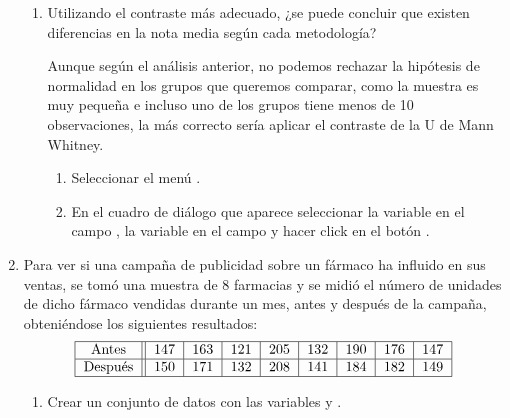 \begin{enumerate}[leftmargin=*]
\begin{enumerate}
\item Utilizando el contraste más adecuado, ¿se puede concluir que existen diferencias en la nota media según cada
metodología?
\begin{indicacion}
{Aunque según el análisis anterior, no podemos rechazar la hipótesis de normalidad en los grupos que queremos comparar,
como la muestra es muy pequeña e incluso uno de los grupos tiene menos de 10 observaciones, la más correcto sería
aplicar el contraste de la U de Mann Whitney.
\begin{enumerate}
\item Seleccionar el menú .
\item En el cuadro de diálogo que aparece seleccionar la variable  en el campo , la variable
 en el campo  y hacer click en el botón .
\end{enumerate}
}
\end{indicacion}
\end{enumerate}

\item  Para ver si una campaña de publicidad sobre un fármaco ha influido en sus ventas, se tomó una muestra de 8
farmacias y se midió el número de unidades de dicho fármaco vendidas durante un mes, antes y después de la campaña,
obteniéndose los siguientes resultados:
\[
\begin{tabular}{|c||c|c|c|c|c|c|c|c|}
\hline Antes & 147 & 163 & 121 & 205 & 132 & 190 & 176 & 147 \\
\hline Después & 150 & 171 & 132 & 208 & 141 & 184 & 182 & 149
\\ \hline
\end{tabular}
\]
\begin{enumerate}
\item Crear un conjunto de datos  con las variables  y .


\end{enumerate}
\end{enumerate}
